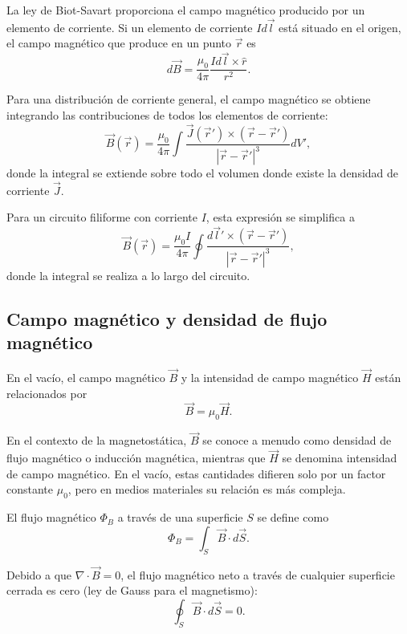 \documentclass[12pt,a4paper]{book}
\begin{document}
La ley de Biot-Savart proporciona el campo magnético producido por un elemento de corriente. Si un elemento de corriente $I d\vec{l}$ está situado en el origen, el campo magnético que produce en un punto $\vec{r}$ es
\begin{equation}
d\vec{B} = \frac{\mu_0}{4\pi} \frac{I d\vec{l} \times \hat{r}}{r^2}.
\end{equation}

Para una distribución de corriente general, el campo magnético se obtiene integrando las contribuciones de todos los elementos de corriente:
\begin{equation}
\vec{B}(\vec{r}) = \frac{\mu_0}{4\pi} \int \frac{\vec{J}(\vec{r}') \times (\vec{r} - \vec{r}')}{|\vec{r} - \vec{r}'|^3} dV',
\end{equation}
donde la integral se extiende sobre todo el volumen donde existe la densidad de corriente $\vec{J}$.

Para un circuito filiforme con corriente $I$, esta expresión se simplifica a
\begin{equation}
\vec{B}(\vec{r}) = \frac{\mu_0 I}{4\pi} \oint \frac{d\vec{l}' \times (\vec{r} - \vec{r}')}{|\vec{r} - \vec{r}'|^3},
\end{equation}
donde la integral se realiza a lo largo del circuito.

\subsection{Campo magnético y densidad de flujo magnético}

En el vacío, el campo magnético $\vec{B}$ y la intensidad de campo magnético $\vec{H}$ están relacionados por
\begin{equation}
\vec{B} = \mu_0 \vec{H}.
\end{equation}

En el contexto de la magnetostática, $\vec{B}$ se conoce a menudo como densidad de flujo magnético o inducción magnética, mientras que $\vec{H}$ se denomina intensidad de campo magnético. En el vacío, estas cantidades difieren solo por un factor constante $\mu_0$, pero en medios materiales su relación es más compleja.

El flujo magnético $\Phi_B$ a través de una superficie $S$ se define como
\begin{equation}
\Phi_B = \int_S \vec{B} \cdot d\vec{S}.
\end{equation}

Debido a que $\nabla \cdot \vec{B} = 0$, el flujo magnético neto a través de cualquier superficie cerrada es cero (ley de Gauss para el magnetismo):
\begin{equation}
\oint_S \vec{B} \cdot d\vec{S} = 0.
\end{equation}
\end{document}
